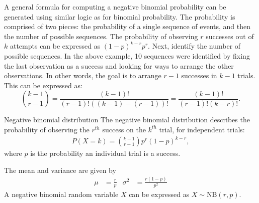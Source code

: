 \textD{\newpage}

A general formula for computing a negative binomial probability can be generated using similar logic as for binomial probability. The probability is comprised of two pieces: the probability of a single sequence of events, and then the number of possible sequences. The probability of observing $r$ successes out of $k$ attempts can be expressed as $(1-p)^{k-r} p^{r}$. Next, identify the number of possible sequences. In the above example, 10 sequences were identified by fixing the last observation as a success and looking for ways to arrange the other observations. In other words, the goal is to arrange $r-1$ successes in $k-1$ trials. This can be expressed as: \[{k-1 \choose r-1} = \frac{(k-1)!}{(r-1)! \left((k-1) - (r-1)\right)!} = \frac{(k-1)!}{(r-1)! \left(k - r\right)!}.\]

\begin{onebox}{Negative binomial distribution}
The negative binomial distribution describes the probability of observing the $r^{th}$ success on the $k^{th}$ trial, for independent trials:
\begin{eqnarray}
P(X = k) = {k-1 \choose r-1} p^{r}(1-p)^{k-r},
\label{negativeBinomialEquation}
\end{eqnarray}
where $p$ is the probability an individual trial is a success.

The mean and variance are given by\vspace{-2.5mm}
\begin{align*}
\mu &= \frac{r}{p}
&\sigma^2&=\frac{r(1-p)}{p^2}
\end{align*}
A negative binomial random variable $X$ can be expressed as $X \sim \textrm{NB}(r, p)$.
\end{onebox}


